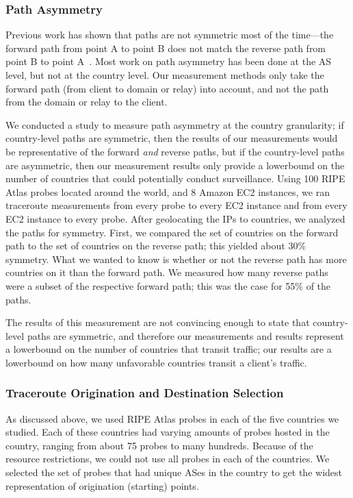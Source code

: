 \subsubsection{Path Asymmetry}
\label{path_sym}
Previous work has shown that paths are not symmetric most of the time---the forward path from point A to point B does not match the reverse path from point B to point A~\cite{he2005routing}.  Most work on path asymmetry has been done at the AS level, but not at the country level.  Our measurement methods only take the forward path (from client to domain or relay) into account, and not the path from the domain or relay to the client.  

We conducted a study to measure path asymmetry at the country granularity; if country-level paths are symmetric, then the results of our measurements would be representative of the forward {\it and} reverse paths, but if the country-level paths are asymmetric, then our measurement results only provide a lowerbound on the number of countries that could potentially conduct surveillance.  Using 100 RIPE Atlas probes located around the world, and 8 Amazon EC2 instances, we ran traceroute measurements from every probe to every EC2 instance and from every EC2 instance to every probe.  After geolocating the IPs to countries, we analyzed the paths for symmetry.  First, we compared the set of countries on the forward path to the set of countries on the reverse path; this yielded about 30\% symmetry.  What we wanted to know is whether or not the reverse path has more countries on it than the forward path.  We measured how many reverse paths were a subset of the respective forward path; this was the case for 55\% of the paths.  

The results of this measurement are not convincing enough to state that country-level paths are symmetric, and therefore our measurements and results represent a lowerbound on the number of countries that transit traffic; our results are a lowerbound on how many unfavorable countries transit a client's traffic.

\subsubsection{Traceroute Origination and Destination Selection}
As discussed above, we used RIPE Atlas probes in each of the five countries we studied.  Each of these countries had varying amounts of probes hosted in the country, ranging from about 75 probes to many hundreds.  Because of the resource restrictions, we could not use all probes in each of the countries.  We selected the set of probes that had unique ASes in the country to get the widest representation of origination (starting) points.

